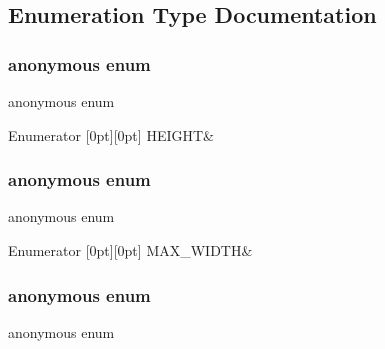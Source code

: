 \subsection{Enumeration Type Documentation}
\mbox{\label{namespacebitmapfont_adcfe4550c64eee8fa86550505cc2da7c}} 
\subsubsection{\texorpdfstring{anonymous enum}{anonymous enum}}
{\footnotesize\ttfamily anonymous enum}

\begin{DoxyEnumFields}{Enumerator}
[0pt][0pt]{}\mbox{\label{namespacebitmapfont_adcfe4550c64eee8fa86550505cc2da7ca5a377f274522b368f96f18c7cc4aaabe}} 
H\+E\+I\+G\+HT&\\
\hline

\end{DoxyEnumFields}
\mbox{\label{namespacebitmapfont_aff842bca09d4d497d7bafc1f7441c934}} 
\subsubsection{\texorpdfstring{anonymous enum}{anonymous enum}}
{\footnotesize\ttfamily anonymous enum}

\begin{DoxyEnumFields}{Enumerator}
[0pt][0pt]{}\mbox{\label{namespacebitmapfont_aff842bca09d4d497d7bafc1f7441c934ab93f490880f5db8eb24cb59d50747801}} 
M\+A\+X\+\_\+\+W\+I\+D\+TH&\\
\hline

\end{DoxyEnumFields}
\mbox{\label{namespacebitmapfont_aaa5cc398faeeb4a2db9da196b2c9f90e}} 
\subsubsection{\texorpdfstring{anonymous enum}{anonymous enum}}
{\footnotesize\ttfamily anonymous enum}

